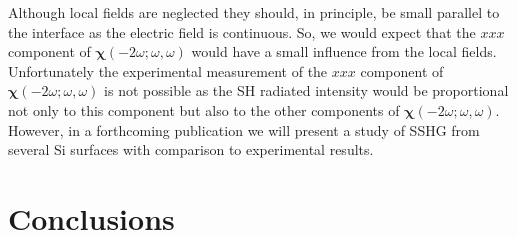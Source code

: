 \documentclass[floatfix,prb,aps,superscriptaddress,showpacs,letterpaper]{revtex4}
\begin{document}
Although local fields are neglected they should, in principle, 
be small parallel to the interface as the electric field is continuous.
So, we would expect that the $xxx$ component of 
$\boldsymbol{\chi}(-2\omega;\omega,\omega)$ would have a small influence from the local fields.
Unfortunately the experimental measurement of the $xxx$
component of $\boldsymbol{\chi}(-2\omega;\omega,\omega)$ is not possible as the SH 
radiated intensity would be proportional not only to this component 
but also to the other components of $\boldsymbol{\chi}(-2\omega;\omega,\omega)$.  
However,
in a forthcoming publication 
we will present a study of SSHG from several 
Si surfaces 
with comparison to experimental 
results. 

\section{Conclusions}\label{conc}
\end{document}
